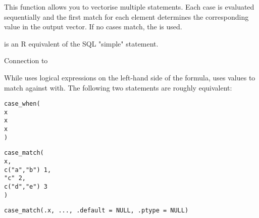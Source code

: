 \documentclass[a4paper]{book}
\begin{document}
\begin{Description}
This function allows you to vectorise multiple  statements. Each
case is evaluated sequentially and the first match for each element
determines the corresponding value in the output vector. If no cases match,
the  is used.

 is an R equivalent of the SQL "simple"  statement.
%
\begin{SubSection}{Connection to }

While  uses logical expressions on the left-hand side of the
formula,  uses values to match against  with. The following
two statements are roughly equivalent:

\begin{alltt}case_when(
  x %in% c("a", "b") ~ 1,
  x %in% "c" ~ 2,
  x %in% c("d", "e") ~ 3
)

case_match(
  x,
  c("a", "b") ~ 1,
  "c" ~ 2,
  c("d", "e") ~ 3
)
\end{alltt}

\end{SubSection}

\end{Description}
%
\begin{Usage}
\begin{verbatim}
case_match(.x, ..., .default = NULL, .ptype = NULL)
\end{verbatim}
\end{Usage}
%
\end{document}
